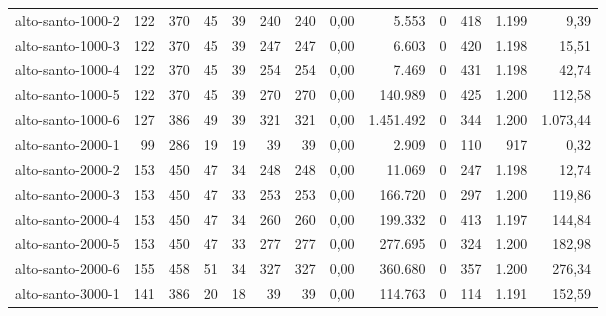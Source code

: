 \begin{table}[ht!]
{\begin{tabular}{lrrrrrrrrrrrr}
			\rowcolor{rowgrey}alto-santo-1000-2                                                       & 122 & 370   & 45  & 39 & 240 & 240 & 0,00  & 5.553     & 0 & 418    & 1.199 & 9,39     \\
			\rowcolor{rowgrey}alto-santo-1000-3                                                       & 122 & 370   & 45  & 39 & 247 & 247 & 0,00  & 6.603     & 0 & 420    & 1.198 & 15,51    \\
			\rowcolor{rowgrey}alto-santo-1000-4                                                       & 122 & 370   & 45  & 39 & 254 & 254 & 0,00  & 7.469     & 0 & 431    & 1.198 & 42,74    \\
			\rowcolor{rowgrey}alto-santo-1000-5                                                       & 122 & 370   & 45  & 39 & 270 & 270 & 0,00  & 140.989   & 0 & 425    & 1.200 & 112,58   \\
			\rowcolor{rowgrey}alto-santo-1000-6                                                       & 127 & 386   & 49  & 39 & 321 & 321 & 0,00  & 1.451.492 & 0 & 344    & 1.200 & 1.073,44 \\
			\rowcolor{rowgrey}alto-santo-2000-1                                                       & 99  & 286   & 19  & 19 & 39  & 39  & 0,00  & 2.909     & 0 & 110    & 917   & 0,32     \\
			\rowcolor{rowgrey}alto-santo-2000-2                                                       & 153 & 450   & 47  & 34 & 248 & 248 & 0,00  & 11.069    & 0 & 247    & 1.198 & 12,74    \\
			\rowcolor{rowgrey}alto-santo-2000-3                                                       & 153 & 450   & 47  & 33 & 253 & 253 & 0,00  & 166.720   & 0 & 297    & 1.200 & 119,86   \\
			\rowcolor{rowgrey}alto-santo-2000-4                                                       & 153 & 450   & 47  & 34 & 260 & 260 & 0,00  & 199.332   & 0 & 413    & 1.197 & 144,84   \\
			\rowcolor{rowgrey}alto-santo-2000-5                                                       & 153 & 450   & 47  & 33 & 277 & 277 & 0,00  & 277.695   & 0 & 324    & 1.200 & 182,98   \\
			\rowcolor{rowgrey}alto-santo-2000-6                                                       & 155 & 458   & 51  & 34 & 327 & 327 & 0,00  & 360.680   & 0 & 357    & 1.200 & 276,34   \\
			\rowcolor{rowgrey}alto-santo-3000-1                                                       & 141 & 386   & 20  & 18 & 39  & 39  & 0,00  & 114.763   & 0 & 114    & 1.191 & 152,59   \\

\end{tabular}}
\end{table}
